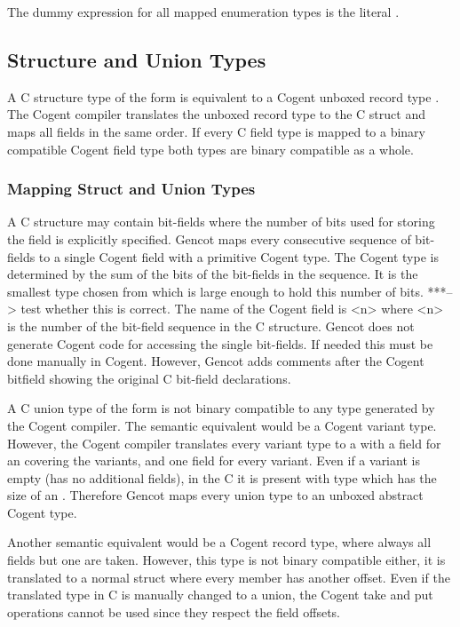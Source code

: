 The dummy expression for all mapped enumeration types is the literal .

\subsection{Structure and Union Types}
\label{design-types-struct}

A C structure type of the form  is equivalent to a Cogent unboxed record type .
The Cogent compiler translates the unboxed record type to the C struct and maps all fields in the same order.
If every C field type is mapped to a binary compatible Cogent field type both types are binary compatible as a whole.

\subsubsection{Mapping Struct and Union Types}
A C structure may contain bit-fields where the number of bits used for storing the field is explicitly specified.
Gencot maps every consecutive sequence of bit-fields to a single Cogent field with a primitive Cogent type.
The Cogent type is determined by the sum of the bits of the bit-fields in the sequence. It is the smallest 
type chosen from  which is large enough to hold this number of bits. 
***--> test whether this is correct.
The name of the
Cogent field is <n> where <n> is the number of the bit-field sequence in the C structure.
Gencot does not generate Cogent code for accessing the single bit-fields. If needed this must be done manually in Cogent.
However, Gencot adds comments after the Cogent bitfield showing the original C bit-field declarations.

A C union type of the form  is not binary compatible to any type generated by the Cogent compiler.
The semantic equivalent would be a Cogent variant type. However, the Cogent compiler translates every variant type
to a  with a field for an  covering the variants, and one field for every variant. Even if a variant
is empty (has no additional fields), in the C  it is present with type  which
has the size of an . Therefore Gencot maps every union type to an unboxed abstract Cogent type.

Another semantic equivalent would be a Cogent record type, where always all fields but one are taken. However,
this type is not binary compatible either, it is translated to a normal struct where every member has another
offset. Even if the translated type in C is manually changed to a union, the Cogent take and put operations cannot
be used since they respect the field offsets. 


